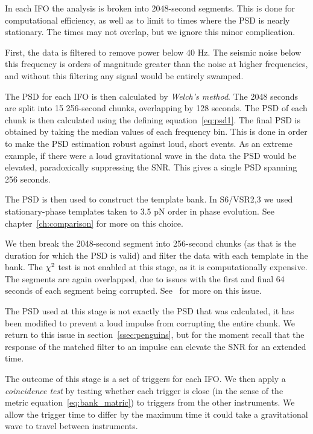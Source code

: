 In each IFO the analysis is broken into 2048-second segments.  This is
done for computational efficiency, as well as to limit to times where
the PSD is nearly stationary.  The times may not overlap, but we
ignore this minor complication.

First, the data is filtered to remove power below 40 Hz.  The seismic
noise below this frequency is orders of magnitude greater than  the
noise at higher frequencies, and without this filtering any signal
would be entirely swamped.

The PSD for each IFO is then calculated by \emph{Welch's method}.  The
2048 seconds are split into 15 256-second chunks, overlapping by 128
seconds.  The PSD of each chunk is then calculated using the defining
equation~\ref{eq:psd1}.  The final PSD is obtained by taking the
median values of each frequency bin. This is done in order to make the
PSD estimation robust against loud, short events.  As an extreme
example, if there were a loud gravitational wave in the data the PSD
would be elevated, paradoxically suppressing the SNR.  This gives a
single PSD spanning 256 seconds.

The PSD is then used to construct the template bank.  In S6/VSR2,3 we
used stationary-phase templates taken to 3.5 pN order in phase
evolution.  See chapter~\ref{ch:comparison} for more on this choice.

We then break the 2048-second segment into 256-second chunks (as that
is the duration for which the PSD is valid) and filter the data with
each template in the bank.  The $\chi^2$ test is not enabled at this
stage, as it is computationally expensive.  The segments are again
overlapped, due to issues with the first and final 64 seconds of each
segment being corrupted.  See~\cite{DBrownThesis} for more on this
issue.

The PSD used at this stage is not exactly the PSD that was calculated,
it has been modified to prevent a loud impulse from corrupting the
entire chunk.  We return to this issue in section~\ref{ssec:penguins},
but for the moment recall that the response of the matched filter to
an impulse can elevate the SNR for an extended time.

The outcome of this stage is a set of triggers for each IFO.  We then
apply a \emph{coincidence test} by testing whether each trigger is
close (in the sense of the metric equation~\ref{eq:bank_matric}) to
triggers from the other instruments.  We allow the trigger time to
differ by the maximum time it could take a gravitational wave to
travel between instruments.

